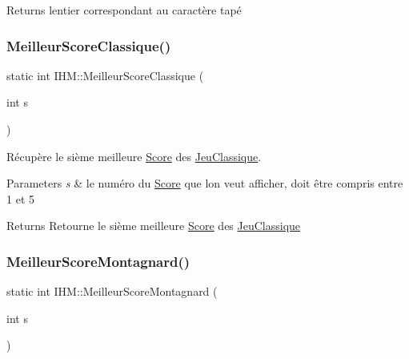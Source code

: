 \begin{DoxyReturn}{Returns}
l\textquotesingle{}entier correspondant au caractère tapé 
\end{DoxyReturn}
\mbox{\label{classIHM_a4218e5b720799dd8bada264c7bc0d690}} 
\subsubsection{\texorpdfstring{Meilleur\+Score\+Classique()}{MeilleurScoreClassique()}}
{\footnotesize\ttfamily static int I\+H\+M\+::\+Meilleur\+Score\+Classique (\begin{DoxyParamCaption}\item[{int}]{s }\end{DoxyParamCaption})\hspace{0.3cm}{\ttfamily [static]}}



Récupère le sième meilleure \hyperlink{classScore}{Score} des \hyperlink{classJeuClassique}{Jeu\+Classique}. 


\begin{DoxyParams}{Parameters}
{\em s} & le numéro du \hyperlink{classScore}{Score} que l\textquotesingle{}on veut afficher, doit être compris entre 1 et 5 \\
\hline
\end{DoxyParams}
\begin{DoxyReturn}{Returns}
Retourne le sième meilleure \hyperlink{classScore}{Score} des \hyperlink{classJeuClassique}{Jeu\+Classique} 
\end{DoxyReturn}
\mbox{\label{classIHM_a068cc2350e9f4fc005ad4378f02d62fa}} 
\subsubsection{\texorpdfstring{Meilleur\+Score\+Montagnard()}{MeilleurScoreMontagnard()}}
{\footnotesize\ttfamily static int I\+H\+M\+::\+Meilleur\+Score\+Montagnard (\begin{DoxyParamCaption}\item[{int}]{s }\end{DoxyParamCaption})\hspace{0.3cm}{\ttfamily [static]}}



